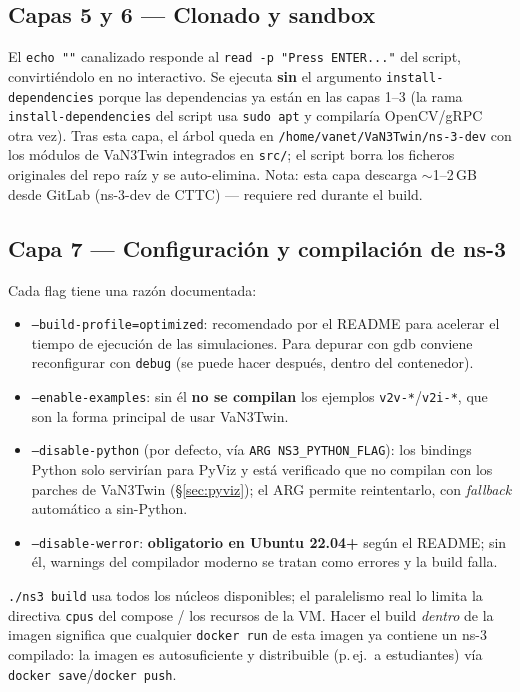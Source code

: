 \documentclass[11pt,a4paper]{article}
\begin{document}
\subsection{Capas 5 y 6 --- Clonado y sandbox}

\begin{implicacion}
El \texttt{echo ""} canalizado responde al \texttt{read -p "Press ENTER..."}
del script, convirti\'endolo en no interactivo. Se ejecuta \textbf{sin} el
argumento \texttt{install-dependencies} porque las dependencias ya est\'an en
las capas 1--3 (la rama \texttt{install-dependencies} del script usa
\texttt{sudo apt} y compilar\'ia OpenCV/gRPC otra vez). Tras esta capa, el
\'arbol queda en \texttt{/home/vanet/VaN3Twin/ns-3-dev} con los m\'odulos de
VaN3Twin integrados en \texttt{src/}; el script borra los ficheros originales
del repo ra\'iz y se auto-elimina. Nota: esta capa descarga $\sim$1--2\,GB
desde GitLab (ns-3-dev de CTTC) --- requiere red durante el build.
\end{implicacion}

\subsection{Capa 7 --- Configuraci\'on y compilaci\'on de ns-3}

\begin{implicacion}
Cada flag tiene una raz\'on documentada:
\begin{itemize}
  \item \texttt{--build-profile=optimized}: recomendado por el README para
  acelerar el tiempo de ejecuci\'on de las simulaciones. Para depurar con gdb
  conviene reconfigurar con \texttt{debug} (se puede hacer despu\'es, dentro
  del contenedor).
  \item \texttt{--enable-examples}: sin \'el \textbf{no se compilan} los
  ejemplos \texttt{v2v-*}/\texttt{v2i-*}, que son la forma principal de usar
  VaN3Twin.
  \item \texttt{--disable-python} (por defecto, v\'ia
  \texttt{ARG NS3\_PYTHON\_FLAG}): los bindings Python solo servir\'ian para
  PyViz y est\'a verificado que no compilan con los parches de VaN3Twin
  (\S\ref{sec:pyviz}); el ARG permite reintentarlo, con \emph{fallback}
  autom\'atico a sin-Python.
  \item \texttt{--disable-werror}: \textbf{obligatorio en Ubuntu 22.04+}
  seg\'un el README; sin \'el, warnings del compilador moderno se tratan como
  errores y la build falla.
\end{itemize}
\texttt{./ns3 build} usa todos los n\'ucleos disponibles; el paralelismo real
lo limita la directiva \texttt{cpus} del compose / los recursos de la VM.
Hacer el build \emph{dentro} de la imagen significa que cualquier
\texttt{docker run} de esta imagen ya contiene un ns-3 compilado: la imagen
es autosuficiente y distribuible (p.\,ej.\ a estudiantes) v\'ia
\texttt{docker save}/\texttt{docker push}.
\end{implicacion}
\end{document}
